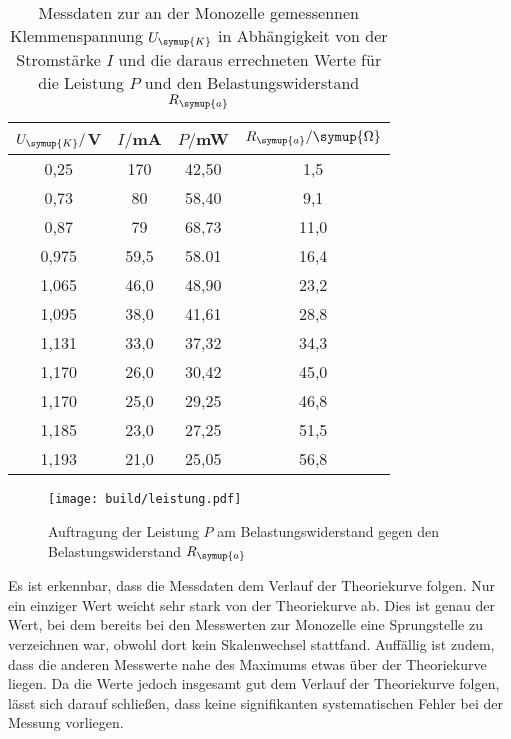 \begin{table}
  \centering
  \caption{Messdaten zur an der Monozelle gemessennen Klemmenspannung $U_{\symup{K}}$
  in Abhängigkeit von der Stromstärke $I$ und die daraus errechneten Werte für
  die Leistung $P$ und den Belastungswiderstand $R_{\symup{a}}$}
  \label{tab:leistung}
  \begin{tabular}{c c c c}
    \toprule
    $U_{\symup{K}}/$V & $I/$mA & $P/$mW & $R_{\symup{a}}/\symup{\Omega}$\\
    \midrule
    0,25	&  170 &   42,50  &  1,5\\
    0,73	&  80  &   58,40  &  9,1\\
    0,87	&  79  &   68,73  &  11,0\\
    0,975	& 59,5 &   58.01  &  16,4\\
    1,065	& 46,0 &   48,90  &  23,2\\
    1,095	& 38,0 &   41,61  &  28,8\\
    1,131	& 33,0 &   37,32  &  34,3\\
    1,170	& 26,0 &   30,42  &  45,0\\
    1,170	& 25,0 &   29,25  &  46,8\\
    1,185	& 23,0 &   27,25  &  51,5\\
    1,193	& 21,0 &   25,05  &  56,8\\
    \bottomrule
  \end{tabular}
\end{table}

\begin{figure}
  \centering
  \texttt{[image: build/leistung.pdf]}
  \caption{Auftragung der Leistung $P$ am Belastungswiderstand gegen den Belastungswiderstand
  $R_{\symup{a}}$}
  \label{fig:leistung}
\end{figure}

Es ist erkennbar, dass die Messdaten dem Verlauf der Theoriekurve folgen.
Nur ein einziger Wert weicht sehr stark von der Theoriekurve ab. Dies ist genau der
Wert, bei dem bereits bei den Messwerten zur Monozelle eine Sprungstelle zu verzeichnen
war, obwohl dort kein Skalenwechsel stattfand. Auffällig ist zudem, dass die anderen
Messwerte nahe des Maximums etwas über der Theoriekurve liegen.
Da die Werte jedoch insgesamt gut dem Verlauf der Theoriekurve folgen, lässt
sich darauf schließen, dass keine signifikanten systematischen Fehler bei der
Messung vorliegen.
